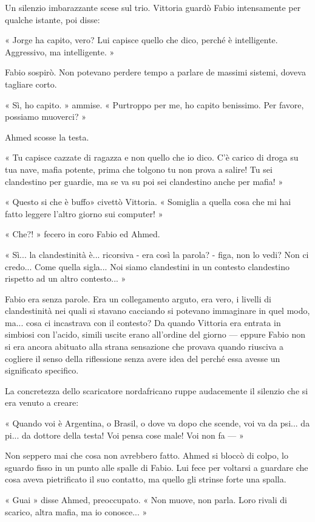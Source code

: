 Un silenzio imbarazzante scese sul trio. Vittoria guardò Fabio intensamente per qualche istante, poi disse:

« Jorge ha capito, vero? Lui capisce quello che dico, perché è intelligente. Aggressivo, ma intelligente. »

Fabio sospirò. Non potevano perdere tempo a parlare de massimi sistemi, doveva tagliare corto.

« Sì, ho capito. » ammise. « Purtroppo per me, ho capito benissimo. Per favore, possiamo muoverci? »

Ahmed scosse la testa.

« Tu capisce cazzate di ragazza e non quello che io dico. C'è carico di droga su tua nave, mafia potente, prima che tolgono tu non prova a salire! Tu sei clandestino per guardie, ma se va su poi sei clandestino anche per mafia! »

« Questo si che è buffo» civettò Vittoria. « Somiglia a quella cosa che mi hai fatto leggere l'altro giorno sui computer! »

« Che?! » fecero in coro Fabio ed Ahmed.

« Sì... la clandestinità è... ricorsiva - era così la parola? - figa, non lo vedi? Non ci credo... Come quella sigla... Noi siamo clandestini in un contesto clandestino rispetto ad un altro contesto... »

Fabio era senza parole. Era un collegamento arguto, era vero, i livelli di clandestinità nei quali si stavano cacciando si potevano immaginare in quel modo, ma... cosa ci incastrava con il contesto? Da quando Vittoria era entrata in simbiosi con l'acido, simili uscite erano all'ordine del giorno --- eppure Fabio non si era ancora abituato alla strana sensazione che provava quando riusciva a cogliere il senso della riflessione senza avere idea del perché essa avesse un significato specifico.

La concretezza dello scaricatore nordafricano ruppe audacemente il silenzio che si era venuto a creare:

« Quando voi è Argentina, o Brasil, o dove va dopo che scende, voi va da psi... da pi... da dottore della testa! Voi pensa cose male! Voi non fa --- »

Non seppero mai che cosa non avrebbero fatto. Ahmed si bloccò di colpo, lo sguardo fisso in un punto alle spalle di Fabio. Lui fece per voltarsi a guardare che cosa aveva pietrificato il suo contatto, ma quello gli strinse forte una spalla.

« Guai » disse Ahmed, preoccupato. « Non muove, non parla. Loro rivali di scarico, altra mafia, ma io conosce... »

